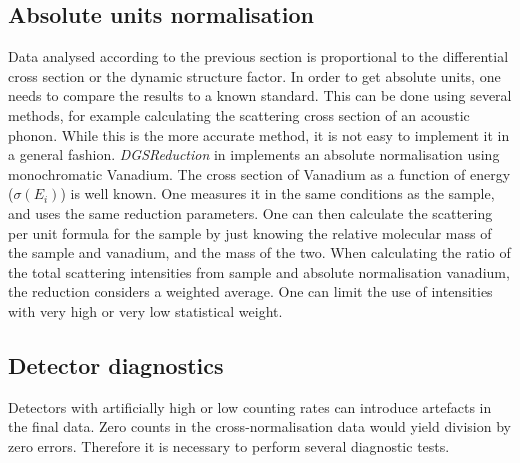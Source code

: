  
\subsection{Absolute units normalisation}
Data analysed according to the previous section is proportional to the differential cross section or the dynamic structure factor. In order to get absolute units, one needs to compare the results to a known standard. This can be done using several methods, for example calculating the scattering cross section of an acoustic phonon. While this is the more accurate method, it is not easy to implement it in a general fashion. \textit{DGSReduction} in \mantid{} implements an absolute normalisation using monochromatic Vanadium. The cross section of Vanadium as a function of energy ($\sigma(E_i)$) is well known. One measures it in the same conditions as the sample, and uses the same reduction parameters. One can then calculate the scattering per unit formula for the sample by just knowing the relative molecular mass of the sample and vanadium, and the mass of the two. When calculating the ratio of the total scattering intensities from sample and absolute normalisation vanadium, the reduction considers a weighted average. One can limit the use of intensities with very high or very low statistical weight. 


\subsection{Detector diagnostics}\label{sec:Physics-detdiag}
Detectors with artificially high or low counting rates can introduce artefacts in the final data. Zero counts in the cross-normalisation data would yield division by zero errors. Therefore it is necessary to perform several diagnostic tests.

